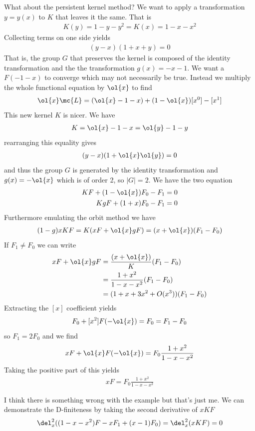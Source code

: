 \begin{example}
What about the persistent kernel method? We want to apply a transformation $y = y(x)$ to $K$ that leaves it the same. That is
\begin{align}
	K(y) = 1 - y - y^2 = K(x) = 1 - x - x^2
\end{align}
Collecting terms on one side yields
\begin{align}
	(y-x)(1+x+y) = 0
\end{align}
That is, the group $G$ that preserves the kernel is composed of the identity transformation and the the transformation $g(x) = -x-1$. We want a $F(-1-x)$ to converge which may not necessarily be true. Instead we multiply the whole functional equation by $\ol{x}$ to find
\begin{align}
\ol{x} \mc{L} = (\ol{x}-1-x) + (1-\ol{x})[x^0]-[x^1]
\end{align}
This new kernel $K$ is nicer. We have
\begin{align}
	K = \ol{x}-1-x = \ol{y}-1-y
\end{align}
rearranging this equality gives
\begin{align}
	(y-x)(1+\ol{x}\ol{y}) = 0
\end{align}
and thus the group $G$ is generated by the identity transformation and $g(x) = -\ol{x}$ which is of order 2, so $|G| = 2$. We have the two equation
\begin{align}
KF +(1-\ol{x})F_0 - F_1 &= 0\\
KgF + (1+x)F_0  - F_1 &=0
\end{align}
Furthermore emulating the orbit method we have
\begin{align}
	(1-g)xKF = K(xF+\ol{x}gF)  = (x+\ol{x})(F_1-F_0)
\end{align}
If $F_1 \neq F_0$ we can write
\begin{align}
	xF+\ol{x}gF &= \frac{(x+\ol{x})}{K}(F_1-F_0) \\
	&= \frac{1+x^2}{1-x-x^2}(F_1-F_0) \\
	&= (1+x+3x^2+O(x^3))(F_1-F_0)
\end{align}
Extracting the $[x]$ coefficient yields
\begin{align}
	F_0 +[x^2]F(-\ol{x}) = F_0 = F_1 - F_0
\end{align}
so $F_1= 2 F_0$ and we find
\begin{align}
	xF+\ol{x}F(-\ol{x}) = F_0 \frac{1+x^2}{1-x-x^2}
\end{align}
Taking the positive part of this yields
\begin{align}
	xF= F_0 \frac{1+x^2}{1-x-x^2}
\end{align}
\end{example}
I think there is something wrong with the example but that's just me. We can demonstrate the D-finiteness by taking the second derivative of $xKF$
\begin{align}
	\del_x^2((1-x - x^2) F - x F_1 + (x-1) F_0) = \del_x^2(xKF) = 0
\end{align}